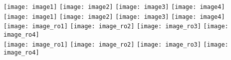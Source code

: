\documentclass{article}
\begin{document}
  \texttt{[image: image1]}
  \texttt{[image: image2]}
  \texttt{[image: image3]}
  \texttt{[image: image4]}\\
 \texttt{[image: image1]}
 \texttt{[image: image2]}
 \texttt{[image: image3]}
 \texttt{[image: image4]}\\

  \texttt{[image: image\_ro1]}
  \texttt{[image: image\_ro2]}
  \texttt{[image: image\_ro3]}
  \texttt{[image: image\_ro4]}\\
 \texttt{[image: image\_ro1]}
 \texttt{[image: image\_ro2]}
 \texttt{[image: image\_ro3]}
 \texttt{[image: image\_ro4]}\\
\end{document}
